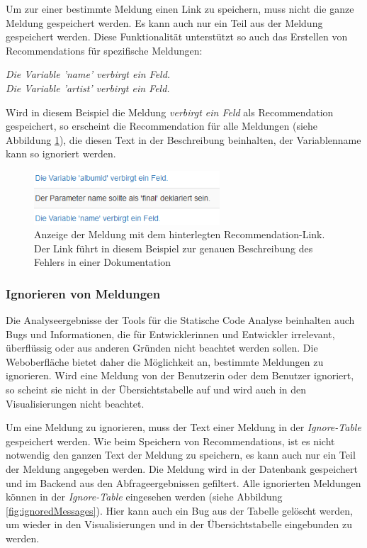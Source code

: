 Um zur einer bestimmte Meldung einen Link zu speichern, muss nicht die ganze Meldung gespeichert werden. Es kann auch nur ein Teil aus der Meldung gespeichert werden. Diese Funktionalität unterstützt so auch das Erstellen von Recommendations für spezifische Meldungen:

\textit{Die Variable 'name' verbirgt ein Feld.}\\
\textit{Die Variable 'artist' verbirgt ein Feld.}

Wird in diesem Beispiel die Meldung \textit{verbirgt ein Feld} als Recommendation gespeichert, so erscheint die Recommendation für alle Meldungen (siehe Abbildung \ref{fig:recommendations}), die diesen Text in der Beschreibung beinhalten, der Variablenname kann so ignoriert werden. 

\begin{figure}[tp]
  \centering
  \includegraphics[height=2cm]{images/recommendation.PNG}
 \caption[Anzeige der Meldung mit dem hinterlegten Recommendation-Link. Der Link führt in diesem Beispiel zur genauen Beschreibung des Fehlers in einer Dokumentation]{Anzeige der Meldung mit dem hinterlegten Recommendation-Link. Der Link führt in diesem Beispiel zur genauen Beschreibung des Fehlers in einer Dokumentation}
  \label{fig:recommendations}
\end{figure}

\subsubsection{Ignorieren von Meldungen}
Die Analyseergebnisse der Tools für die Statische Code Analyse beinhalten auch Bugs und Informationen, die für Entwicklerinnen und Entwickler irrelevant, überflüssig  oder aus anderen Gründen nicht beachtet werden sollen. Die Weboberfläche bietet daher die Möglichkeit an, bestimmte Meldungen zu ignorieren. Wird eine Meldung von der Benutzerin oder dem Benutzer ignoriert, so scheint sie nicht in der Übersichtstabelle auf und wird auch in den Visualisierungen nicht beachtet. 

Um eine Meldung zu ignorieren, muss der Text einer Meldung in der \textit{Ignore-Table} gespeichert werden. Wie beim Speichern von Recommendations, ist es nicht notwendig den ganzen Text der Meldung zu speichern, es kann auch nur ein Teil der Meldung angegeben werden.  
Die Meldung wird in der Datenbank gespeichert und im Backend aus den Abfrageergebnissen gefiltert. Alle ignorierten Meldungen können in der \textit{Ignore-Table} eingesehen werden (siehe Abbildung \ref{fig:ignoredMessages}). Hier kann auch ein Bug aus der Tabelle gelöscht werden, um wieder in den Visualisierungen und in der Übersichtstabelle eingebunden zu werden.

